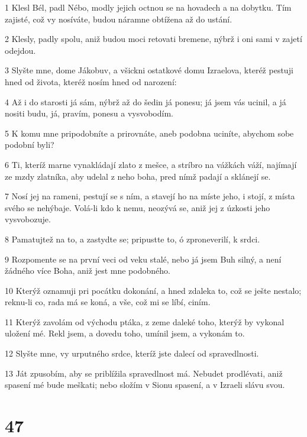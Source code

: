 \par 1 Klesl Bél, padl Nébo, modly jejich octnou se na hovadech a na dobytku. Tím zajisté, což vy nosíváte, budou náramne obtížena až do ustání.
\par 2 Klesly, padly spolu, aniž budou moci retovati bremene, nýbrž i oni sami v zajetí odejdou.
\par 3 Slyšte mne, dome Jákobuv, a všickni ostatkové domu Izraelova, kteréž pestuji hned od života, kteréž nosím hned od narození:
\par 4 Až i do starosti já sám, nýbrž až do šedin já ponesu; já jsem vás ucinil, a já nositi budu, já, pravím, ponesu a vysvobodím.
\par 5 K komu mne pripodobníte a prirovnáte, aneb podobna uciníte, abychom sobe podobní byli?
\par 6 Ti, kteríž marne vynakládají zlato z mešce, a stríbro na vážkách váží, najímají ze mzdy zlatníka, aby udelal z neho boha, pred nímž padají a sklánejí se.
\par 7 Nosí jej na rameni, pestují se s ním, a stavejí ho na míste jeho, i stojí, z místa svého se nehýbaje. Volá-li kdo k nemu, neozývá se, aniž jej z úzkosti jeho vysvobozuje.
\par 8 Pamatujtež na to, a zastydte se; pripustte to, ó zproneverilí, k srdci.
\par 9 Rozpomente se na první veci od veku stalé, nebo já jsem Buh silný, a není žádného více Boha, aniž jest mne podobného.
\par 10 Kterýž oznamuji pri pocátku dokonání, a hned zdaleka to, což se ješte nestalo; reknu-li co, rada má se koná, a vše, což mi se líbí, ciním.
\par 11 Kterýž zavolám od východu ptáka, z zeme daleké toho, kterýž by vykonal uložení mé. Rekl jsem, a dovedu toho, umínil jsem, a vykonám to.
\par 12 Slyšte mne, vy urputného srdce, kteríž jste dalecí od spravedlnosti.
\par 13 Ját zpusobím, aby se priblížila spravedlnost má. Nebudet prodlévati, aniž spasení mé bude meškati; nebo složím v Sionu spasení, a v Izraeli slávu svou.

\chapter{47}

